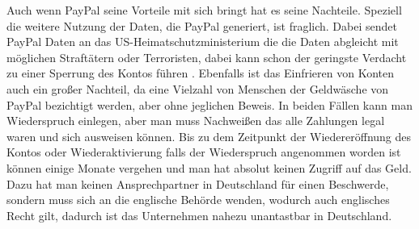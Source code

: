Auch wenn PayPal seine Vorteile mit sich bringt hat es seine Nachteile. Speziell die weitere Nutzung der Daten, die PayPal generiert, ist fraglich. Dabei sendet PayPal Daten an das US-Heimatschutzministerium die die Daten abgleicht mit möglichen Straftätern oder Terroristen, dabei kann schon der geringste Verdacht zu einer Sperrung des Kontos führen \cite{paypal-sinn-unsinn}. Ebenfalls ist das Einfrieren von Konten auch ein großer Nachteil, da eine Vielzahl von Menschen der Geldwäsche von PayPal bezichtigt werden, aber ohne jeglichen Beweis. In beiden Fällen kann man Wiederspruch einlegen, aber man muss Nachweißen das alle Zahlungen legal waren und sich ausweisen können. Bis zu dem Zeitpunkt der Wiedereröffnung des Kontos oder Wiederaktivierung falls der Wiederspruch angenommen worden ist können einige Monate vergehen und man hat absolut keinen Zugriff auf das Geld. Dazu hat man keinen Ansprechpartner in Deutschland für einen Beschwerde, sondern muss sich an die englische Behörde wenden, wodurch auch englisches Recht gilt, dadurch ist das Unternehmen nahezu unantastbar in Deutschland. 
